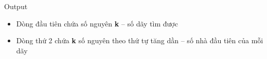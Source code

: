 Output
\begin{itemize}
	\item Dòng đầu tiên chứa số nguyên \textbf{k} – số dãy tìm được
	\item Dòng thứ 2 chứa \textbf{k} số nguyên theo thứ tự tăng dần – số nhà đầu tiên của mỗi dãy
\end{itemize}